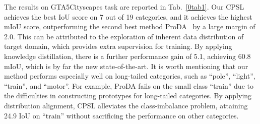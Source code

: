 \documentclass[10pt,twocolumn,letterpaper]{article}
\begin{document}
	\vspace{0.1em}  The results on GTA5Cityscapes task are reported in Tab.~\ref{0tab1}. Our CPSL achieves the best IoU score on 7 out of 19 categories, and it achieves the highest mIoU score, outperforming the second best method ProDA~\cite{zhang2021prototypical} by a large margin of 2.0. This can be attributed to the exploration of inherent data distribution of target domain, which provides extra supervision for training. By applying knowledge distillation, there is a further performance gain of 5.1, achieving 60.8 mIoU, which is by far the new state-of-the-art. It is worth mentioning that our method performs especially well on long-tailed categories, such as ``pole'', ``light'', ``train'', and ``motor''. For example, ProDA fails on the small class ``train'' due to the difficulties in constructing prototypes for long-tailed categories. By applying distribution alignment, CPSL alleviates the class-imbalance problem, attaining 24.9 IoU on ``train'' without sacrificing the performance on other categories.
\end{document}

